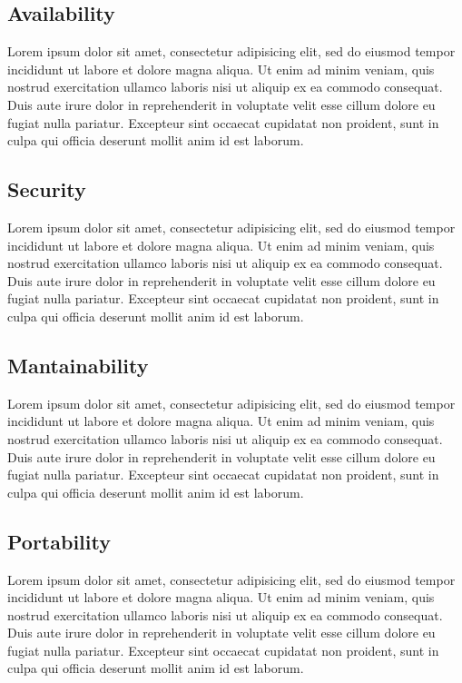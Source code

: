 \documentclass{report}
\begin{document}
	
	\subsection{Availability}
	Lorem ipsum dolor sit amet, consectetur adipisicing elit, sed do eiusmod
	tempor incididunt ut labore et dolore magna aliqua. Ut enim ad minim veniam,
	quis nostrud exercitation ullamco laboris nisi ut aliquip ex ea commodo
	consequat. Duis aute irure dolor in reprehenderit in voluptate velit esse
	cillum dolore eu fugiat nulla pariatur. Excepteur sint occaecat cupidatat non
	proident, sunt in culpa qui officia deserunt mollit anim id est laborum.
	
	
	\subsection{Security}
	Lorem ipsum dolor sit amet, consectetur adipisicing elit, sed do eiusmod
	tempor incididunt ut labore et dolore magna aliqua. Ut enim ad minim veniam,
	quis nostrud exercitation ullamco laboris nisi ut aliquip ex ea commodo
	consequat. Duis aute irure dolor in reprehenderit in voluptate velit esse
	cillum dolore eu fugiat nulla pariatur. Excepteur sint occaecat cupidatat non
	proident, sunt in culpa qui officia deserunt mollit anim id est laborum.
	
	
	\subsection{Mantainability}
	Lorem ipsum dolor sit amet, consectetur adipisicing elit, sed do eiusmod
	tempor incididunt ut labore et dolore magna aliqua. Ut enim ad minim veniam,
	quis nostrud exercitation ullamco laboris nisi ut aliquip ex ea commodo
	consequat. Duis aute irure dolor in reprehenderit in voluptate velit esse
	cillum dolore eu fugiat nulla pariatur. Excepteur sint occaecat cupidatat non
	proident, sunt in culpa qui officia deserunt mollit anim id est laborum.
	
	
	\subsection{Portability}
	Lorem ipsum dolor sit amet, consectetur adipisicing elit, sed do eiusmod
	tempor incididunt ut labore et dolore magna aliqua. Ut enim ad minim veniam,
	quis nostrud exercitation ullamco laboris nisi ut aliquip ex ea commodo
	consequat. Duis aute irure dolor in reprehenderit in voluptate velit esse
	cillum dolore eu fugiat nulla pariatur. Excepteur sint occaecat cupidatat non
	proident, sunt in culpa qui officia deserunt mollit anim id est laborum.
	
\end{document}
